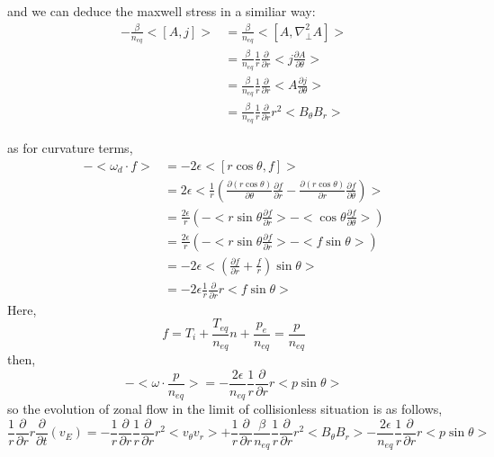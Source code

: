 \documentclass[11pt,a4paper]{article}
\begin{document}
	and we can deduce the maxwell stress in a similiar way:
	\begin{equation}
	\begin{aligned}
		-\frac{\beta}{n_{eq}}<[A,j]>
		&=\frac{\beta}{n_{eq}}<[A,\nabla_\perp^2{A}]>	\\
		&=\frac{\beta}{n_{eq}}\frac{1}{r}\frac{\partial}{\partial{r}}<j\frac{\partial{A}}{\partial\theta}>	\\
		&=\frac{\beta}{n_{eq}}\frac{1}{r}\frac{\partial}{\partial{r}}<A\frac{\partial{j}}{\partial\theta}>	\\
		&=\frac{\beta}{n_{eq}}\frac{1}{r}\frac{\partial}{\partial{r}}r^2<B_\theta{B_r}>
	\end{aligned}
	\end{equation}

	as for curvature terms,
	\begin{equation}
	\begin{aligned}
		-<\omega_d\cdot{f}>
		&=-2\epsilon<[r\cos\theta,f]>	\\
		&=2\epsilon<\frac{1}{r}(\frac{\partial(r\cos\theta)}{\partial\theta}\frac{\partial{f}}{\partial{r}}-\frac{\partial(r\cos\theta)}{\partial{r}}\frac{\partial{f}}{\partial\theta})>	\\
		&=\frac{2\epsilon}{r}(-<r\sin\theta\frac{\partial{f}}{\partial{r}}>-<\cos\theta\frac{\partial{f}}{\partial\theta}>)	\\
		&=\frac{2\epsilon}{r}(-<r\sin\theta\frac{\partial{f}}{\partial{r}}>-<f\sin\theta>)	\\
		&=-2\epsilon<(\frac{\partial{f}}{\partial{r}}+\frac{f}{r})\sin\theta>\\
		&=-2\epsilon\frac{1}{r}\frac{\partial}{\partial{r}}r<f\sin\theta>
	\end{aligned}
	\end{equation}
	Here,
	\begin{equation}
		f=T_i+\frac{T_{eq}}{n_{eq}}n+\frac{p_e}{n_{eq}}=\frac{p}{n_{eq}}
	\end{equation} 
	then,
	\begin{equation}
		-<\omega\cdot{\frac{p}{n_{eq}}}>=-\frac{2\epsilon}{n_{eq}}\frac{1}{r}\frac{\partial}{\partial{r}}r<p\sin\theta>
	\end{equation}
	so the evolution of zonal flow in the limit of collisionless situation is as follows,
	\begin{equation}
		\frac{1}{r}\frac{\partial}{\partial{r}}r\frac{\partial}{\partial{t}}({v_E})
		=-\frac{1}{r}\frac{\partial}{\partial{r}}  \frac{1}{r}\frac{\partial}{\partial{r}}r^2<v_\theta{v_r}>
		+\frac{1}{r}\frac{\partial}{\partial{r}} 
		\frac{\beta}{n_{eq}}\frac{1}{r}\frac{\partial}{\partial{r}}r^2<B_\theta{B_r}>
		-\frac{2\epsilon}{n_{eq}}\frac{1}{r}\frac{\partial}{\partial{r}}r<p\sin\theta>
	\end{equation}
\end{document}
